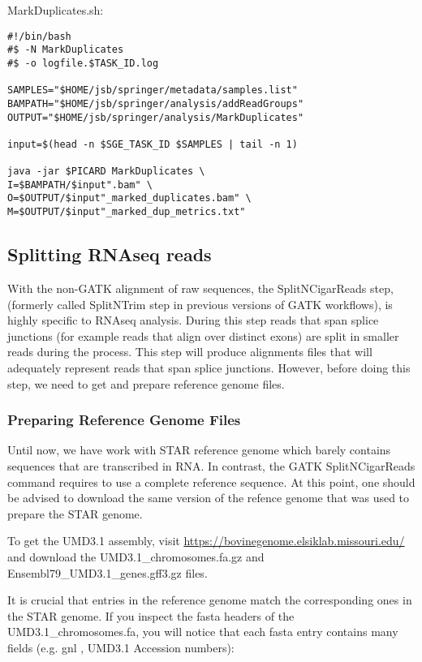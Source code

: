 \noindent MarkDuplicates.sh:
\begin{verbatim}
#!/bin/bash
#$ -N MarkDuplicates
#$ -o logfile.$TASK_ID.log

SAMPLES="$HOME/jsb/springer/metadata/samples.list"
BAMPATH="$HOME/jsb/springer/analysis/addReadGroups"
OUTPUT="$HOME/jsb/springer/analysis/MarkDuplicates"

input=$(head -n $SGE_TASK_ID $SAMPLES | tail -n 1)

java -jar $PICARD MarkDuplicates \
I=$BAMPATH/$input".bam" \
O=$OUTPUT/$input"_marked_duplicates.bam" \
M=$OUTPUT/$input"_marked_dup_metrics.txt"
\end{verbatim}

\subsection{Splitting RNAseq reads}

With the non-GATK alignment of raw sequences, the SplitNCigarReads step, (formerly called SplitNTrim step in previous versions of GATK workflows), is highly specific to RNAseq analysis. During this step reads that span splice junctions (for example reads that align over distinct exons) are split in smaller reads during the process. This step will produce alignments files that will adequately represent reads that span splice junctions. However, before doing this step, we need to get and prepare reference genome files.


\subsubsection{Preparing Reference Genome Files}

Until now, we have work with STAR reference genome which barely contains sequences that are transcribed in RNA. In contrast, the GATK SplitNCigarReads command requires to use a complete reference sequence. At this point, one should be advised to download the same version of the refence genome that was used to prepare the STAR genome.

To get the UMD3.1 assembly, visit \href{https://bovinegenome.elsiklab.missouri.edu/}{https://bovinegenome.elsiklab.missouri.edu/} and download the UMD3.1\_chromosomes.fa.gz and Ensembl79\_UMD3.1\_genes.gff3.gz files.


It is crucial that entries in the reference genome match the corresponding ones in the STAR genome. If you inspect the fasta headers of the UMD3.1\_chromosomes.fa, you will notice that each fasta entry contains many fields (e.g. gnl , UMD3.1 Accession numbers):

